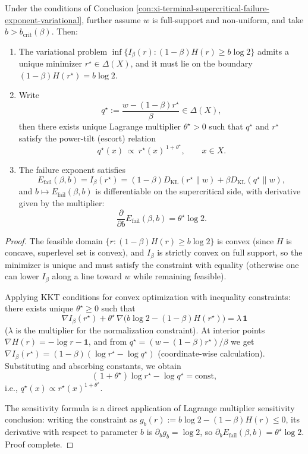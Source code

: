 \begin{conclusion}\label{con:xi-terminal-failure-exponent-escort-kkt}
Under the conditions of Conclusion \ref{con:xi-terminal-supercritical-failure-exponent-variational}, further assume \(w\) is full-support and non-uniform, and take \(b>b_{\mathrm{crit}}(\beta)\).
Then:
\begin{enumerate}
  \item The variational problem
  \(
  \inf\{I_\beta(r):(1-\beta)H(r)\ge b\log 2\}
  \)
  admits a unique minimizer \(r^\star\in\Delta(X)\), and it must lie on the boundary \((1-\beta)H(r^\star)=b\log 2\).
  \item Write
  \[
  q^\star:=\frac{w-(1-\beta)r^\star}{\beta}\in\Delta(X),
  \]
  then there exists unique Lagrange multiplier \(\theta^\star>0\) such that \(q^\star\) and \(r^\star\) satisfy the power-tilt (escort) relation
  \[
  \boxed{\;
  q^\star(x)\ \propto\ r^\star(x)^{\,1+\theta^\star},\qquad x\in X.\;}
  \]
  \item The failure exponent satisfies
  \[
  E_{\mathrm{fail}}(\beta,b)=I_\beta(r^\star)
  =(1-\beta)D_{\mathrm{KL}}(r^\star\|w)+\beta D_{\mathrm{KL}}(q^\star\|w),
  \]
  and \(b\mapsto E_{\mathrm{fail}}(\beta,b)\) is differentiable on the supercritical side, with derivative given by the multiplier:
  \[
  \boxed{\;\frac{\partial}{\partial b}E_{\mathrm{fail}}(\beta,b)=\theta^\star\log 2.\;}
  \]
\end{enumerate}
\end{conclusion}
\begin{proof}[Proof]
The feasible domain \(\{r:(1-\beta)H(r)\ge b\log 2\}\) is convex (since \(H\) is concave, superlevel set is convex), and \(I_\beta\) is strictly convex on full support, so the minimizer is unique and must satisfy the constraint with equality (otherwise one can lower \(I_\beta\) along a line toward \(w\) while remaining feasible).
\par
Applying KKT conditions for convex optimization with inequality constraints: there exists unique \(\theta^\star\ge 0\) such that
\[
\nabla I_\beta(r^\star)+\theta^\star\,\nabla\bigl(b\log 2-(1-\beta)H(r^\star)\bigr)=\lambda\,\mathbf 1
\]
(\(\lambda\) is the multiplier for the normalization constraint).
At interior points \(\nabla H(r)=-\log r-\mathbf 1\), and from \(q^\star=(w-(1-\beta)r^\star)/\beta\) we get
\(
\nabla I_\beta(r^\star)=(1-\beta)(\log r^\star-\log q^\star)
\)
(coordinate-wise calculation).
Substituting and absorbing constants, we obtain
\[
(\,1+\theta^\star)\log r^\star-\log q^\star=\mathrm{const},
\]
i.e., \(q^\star(x)\propto r^\star(x)^{1+\theta^\star}\).
\par
The sensitivity formula is a direct application of Lagrange multiplier sensitivity conclusion: writing the constraint as \(g_b(r):=b\log 2-(1-\beta)H(r)\le 0\), its derivative with respect to parameter \(b\) is \(\partial_b g_b=\log 2\), so \(\partial_b E_{\mathrm{fail}}(\beta,b)=\theta^\star\log 2\).
Proof complete.
\end{proof}

